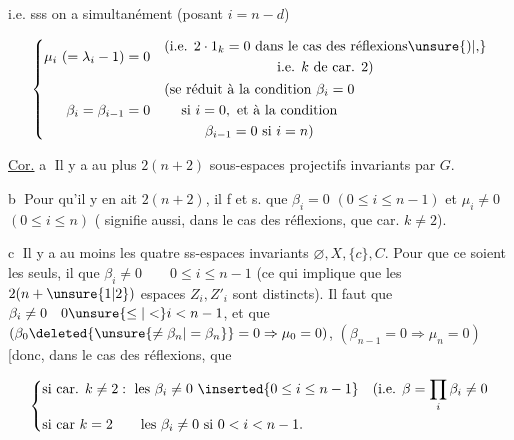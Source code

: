 
i.e. sss on a simultanément (posant $i=n-d$)

\[
\left\{\begin{aligned}
\mu_i\ (=\lambda_i-1)&=0&&
\begin{gathered}
\text{(i.e. }2\cdot1_k=0\text{ dans le cas des réflexions\unsure{)|,}}\\
\text{i.e. } k\text{ de car. }2)
\end{gathered}\\
\beta_i=\beta_{i-1}&=0&&
\begin{gathered}
\text{(se réduit à la condition }\beta_i=0\\
\text{si }i=0,\text{ et à la condition}\\
\beta_{i-1}=0\text{ si }i=n)
\end{gathered}
\end{aligned}\right.
\]


\uline{Cor.} \textcircled{a} Il y a au plus $2(n+2)$ sous-espaces projectifs invariants par $G$.

\textcircled{b} Pour qu'il y en ait $2(n+2)$, il f et s. que $\beta_i=0$ $(0\le i\le n-1)$ et $\mu_i\ne0$ \deleted{\unsure{$\forall$}} $(0\le i\le n)$ ( signifie aussi, dans le cas des réflexions, que car. $k\ne2$).

\textcircled{c}  Il y a au moins les quatre ss-espaces invariants $\varnothing,X,\{c\},C$. Pour que ce soient les seuls, il   que $\beta_i\ne0\qquad 0\le i\le n-1$ (ce qui implique que les $2(n+\unsure{1|2})$ espaces $Z_i,Z'_i$ sont distincts). Il faut  que $\beta_i\ne0\quad 0\unsure{\le|<}i<n-1$, et que $(\beta_0\deleted{\unsure{\ne\beta_n|=\beta_n}}=0\Rightarrow\mu_0=0)$, $(\beta_{n-1}=0\Rightarrow\mu_n=0)$ [donc, dans le cas des réflexions, que

\[
\left\{\begin{aligned}
&\text{si car. }k\ne2:\ \text{les }\beta_i\ne0\ \inserted{0\le i\le n-1}\quad
(\text{i.e. }\beta=\prod_i\beta_i\ne0\\
&\text{si car }k=2\qquad\text{les }\beta_i\ne0\text{ si }0<i<n-1.
\end{aligned}\right.
\]

